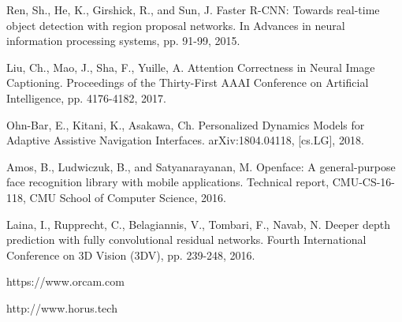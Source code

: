 \documentclass[10pt,conference,compsocconf]{IEEEtran}
\begin{document}
\begin{thebibliography}{1}
 Ren, Sh., He, K., Girshick, R., and Sun, J.  Faster R-CNN: Towards real-time object detection with region proposal networks. In Advances in neural information processing systems, pp. 91-99, 2015.

 Liu, Ch., Mao, J., Sha, F., Yuille, A. Attention Correctness in Neural Image Captioning. Proceedings of the Thirty-First AAAI Conference on Artificial Intelligence, pp. 4176-4182, 2017.

  Ohn-Bar, E., Kitani, K., Asakawa, Ch. Personalized Dynamics Models for Adaptive Assistive Navigation Interfaces. arXiv:1804.04118, [cs.LG], 2018.


 Amos, B., Ludwiczuk, B., and Satyanarayanan, M. Openface:
A general-purpose face recognition library with mobile applications. Technical report, CMU-CS-16-118, CMU School of Computer Science, 2016.


 Laina, I., Rupprecht, C., Belagiannis, V., Tombari, F., Navab, N. Deeper depth prediction with fully convolutional residual networks. Fourth International Conference on 3D Vision (3DV), pp. 239-248, 2016.

 https://www.orcam.com 

 http://www.horus.tech










\end{thebibliography}




\end{document}
